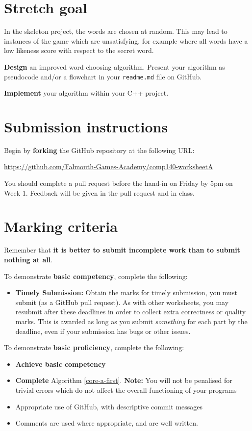 \documentclass{../../../fal_assignment}
\begin{document}
\section{Stretch goal} \label{stretch-a}

In the skeleton project, the words are chosen at random.
This may lead to instances of the game which are unsatisfying, for example where all words
have a low likeness score with respect to the secret word.

\textbf{Design} an improved word choosing algorithm.
Present your algorithm as pseudocode and/or a flowchart in your \texttt{readme.md} file on GitHub.

\textbf{Implement} your algorithm within your C++ project.

\section*{Submission instructions}

Begin by \textbf{forking} the GitHub repository at the following URL:

\url{https://github.com/Falmouth-Games-Academy/comp140-worksheetA}

You should complete a pull request before the hand-in on Friday by 5pm on Week 1. Feedback will be given in the pull request and in class.

\section*{Marking criteria}

Remember that \textbf{it is better to submit incomplete work than to submit nothing at all}. 

To demonstrate \textbf{basic competency}, complete the following:
\begin{itemize}
	\item \textbf{Timely Submission:} Obtain the marks for timely submission, you must submit (as a GitHub pull request).
	As with other worksheets, you may resubmit after these deadlines in order to collect extra correctness or quality marks.
	This is awarded as long as you submit \emph{something} for each part by the deadline,
	even if your submission has bugs or other issues.
\end{itemize} 

To demonstrate \textbf{basic proficiency}, complete the following:
\begin{itemize}
	\item \textbf{Achieve basic competency}
	\item \textbf{Complete} Algorithm \ref{core-a-first}. \textbf{Note:} You will not be penalised for trivial errors which do not
	affect the overall functioning of your programs
	\item Appropriate use of GitHub, with descriptive commit messages 
	\item Comments are used where appropriate, and are well written.
\end{itemize}
\end{document}

